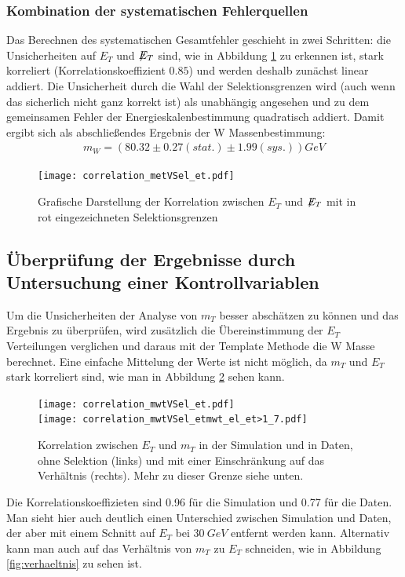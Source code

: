 \documentclass[a4paper,12pt]{article}
\newcommand{\met}{\ensuremath{\not\mathrel{E}}_T}
\begin{document}
\subsubsection*{Kombination der systematischen Fehlerquellen}
Das Berechnen des systematischen Gesamtfehler geschieht in zwei Schritten:
die Unsicherheiten auf $E_{T}$ und $\met$ sind, wie in Abbildung \ref{fig:etVSmet} zu erkennen ist, stark korreliert (Korrelationskoeffizient $0.85$)
und werden deshalb zunächst linear addiert. Die Unsicherheit durch die Wahl der Selektionsgrenzen wird (auch wenn das sicherlich nicht ganz korrekt ist)
als unabhängig angesehen und zu dem gemeinsamen Fehler der Energieskalenbestimmung quadratisch addiert. Damit ergibt sich als abschließendes Ergebnis der
W Massenbestimmung:
\begin{align*}
	m_W = ( 80.32 ± 0.27 (stat.) ± 1.99(sys.)) \si{GeV}
\end{align*}
\begin{figure}[htb]
	\centering
	\texttt{[image: correlation\_metVSel\_et.pdf]}
	\caption{Grafische Darstellung der Korrelation zwischen $E_{T}$ und $\met$ mit in rot eingezeichneten Selektionsgrenzen}
	\label{fig:etVSmet}
\end{figure}

\FloatBarrier
\subsection{Überprüfung der Ergebnisse durch Untersuchung einer Kontrollvariablen}
Um die Unsicherheiten der Analyse von $m_{T}$ besser abschätzen zu können und das Ergebnis zu überprüfen, wird zusätzlich
die Übereinstimmung der $E_T$ Verteilungen verglichen und daraus mit der Template Methode die W Masse
berechnet. Eine einfache Mittelung der Werte ist nicht möglich, da $m_T$ und $E_T$ stark korreliert
sind, wie man in Abbildung \ref{fig:correlation} sehen kann.
\begin{figure}[htb]
	\centering
	\texttt{[image: correlation\_mwtVSel\_et.pdf]}\\
	\texttt{[image: correlation\_mwtVSel\_etmwt\_el\_et>1\_7.pdf]}
	\caption{Korrelation zwischen $E_T$ und $m_T$ in der Simulation und in Daten, ohne Selektion
	(links) und mit einer Einschränkung auf das Verhältnis (rechts). Mehr zu dieser Grenze siehe
	unten.}
	\label{fig:correlation}
\end{figure}

Die Korrelationskoeffizieten sind 0.96 für die Simulation und 0.77 für die Daten. Man sieht hier
auch deutlich einen Unterschied  zwischen Simulation und Daten, der aber mit einem Schnitt auf $E_T$ bei
$\SI{30}{GeV}$ entfernt werden kann. Alternativ kann man auch auf das Verhältnis von $m_T$ zu $E_T$
schneiden, wie in Abbildung \ref{fig:verhaeltnis} zu sehen ist.
\end{document}
